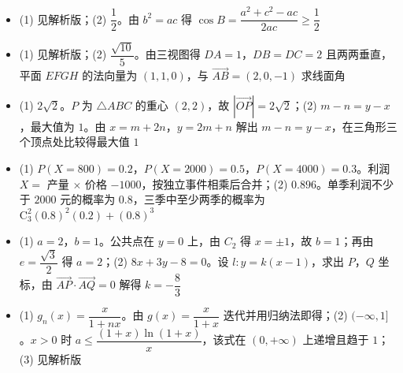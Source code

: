 \begin{itemize}[leftmargin=2.6em]
  \item[\textbf{16.}] (1) 见解析版；(2) $\dfrac12$。由 $b^2=ac$ 得 $\cos B=\dfrac{a^2+c^2-ac}{2ac}\geqslant\dfrac12$
  \item[\textbf{17.}] (1) 见解析版；(2) $\dfrac{\sqrt{10}}5$。由三视图得 $DA=1$，$DB=DC=2$ 且两两垂直，平面 $EFGH$ 的法向量为 $(1,1,0)$，与 $\overrightarrow{AB}=(2,0,-1)$ 求线面角
  \item[\textbf{18.}] (1) $2\sqrt2$。$P$ 为 $\triangle ABC$ 的重心 $(2,2)$，故 $|\overrightarrow{OP}|=2\sqrt2$；(2) $m-n=y-x$，最大值为 $1$。由 $x=m+2n$，$y=2m+n$ 解出 $m-n=y-x$，在三角形三个顶点处比较得最大值 $1$
  \item[\textbf{19.}] (1) $P(X=800)=0.2$，$P(X=2000)=0.5$，$P(X=4000)=0.3$。利润 $X=$ 产量 $\times$ 价格 $-1000$，按独立事件相乘后合并；(2) $0.896$。单季利润不少于 $2000$ 元的概率为 $0.8$，三季中至少两季的概率为 $\mathrm C_3^2(0.8)^2(0.2)+(0.8)^3$
  \item[\textbf{20.}] (1) $a=2$，$b=1$。公共点在 $y=0$ 上，由 $C_2$ 得 $x=\pm1$，故 $b=1$；再由 $e=\dfrac{\sqrt3}{2}$ 得 $a=2$；(2) $8x+3y-8=0$。设 $l:y=k(x-1)$，求出 $P$，$Q$ 坐标，由 $\overrightarrow{AP}\cdot\overrightarrow{AQ}=0$ 解得 $k=-\dfrac83$
  \item[\textbf{21.}] (1) $g_n(x)=\dfrac{x}{1+nx}$。由 $g(x)=\dfrac{x}{1+x}$ 迭代并用归纳法即得；(2) $(-\infty,1]$。$x>0$ 时 $a\leqslant\dfrac{(1+x)\ln(1+x)}x$，该式在 $(0,+\infty)$ 上递增且趋于 $1$；(3) 见解析版
\end{itemize}
